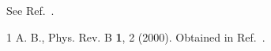 \documentclass[aps,prb]{revtex4-1}
\begin{document}
See Ref.~\cite{k}.
\begin{thebibliography}{1}
\makeatletter
{} A. B., Phys. Rev. B \textbf{1}, 2 (2000).
 Obtained in Ref.~.
\makeatother
\end{thebibliography}
\end{document}

